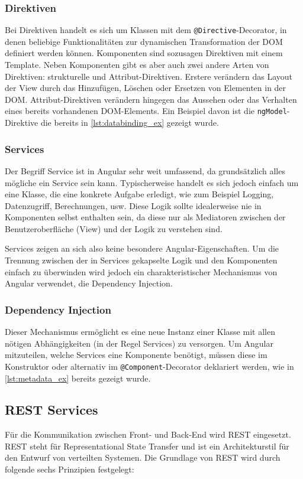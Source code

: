 \subsubsection{Direktiven}
Bei Direktiven handelt es sich um Klassen mit dem \texttt{@Directive}-Decorator, in denen beliebige Funktionalitäten zur dynamischen Transformation der DOM definiert werden können. Komponenten sind sozusagen Direktiven mit einem Template. Neben Komponenten gibt es aber auch zwei andere Arten von Direktiven: strukturelle und Attribut-Direktiven. Erstere verändern das Layout der View durch das Hinzufügen, Löschen oder Ersetzen von Elementen in der \acs{DOM}. Attribut-Direktiven verändern hingegen das Aussehen oder das Verhalten eines bereits vorhandenen DOM-Elements. Ein Beispiel davon ist die \texttt{ngModel}-Direktive die bereits in \cref{lst:databinding_ex} gezeigt wurde.

\subsubsection{Services}
Der Begriff Service ist in Angular sehr weit umfassend, da grundsätzlich alles mögliche ein Service sein kann. Typischerweise handelt es sich jedoch einfach um eine Klasse, die eine konkrete Aufgabe erledigt, wie zum Beispiel Logging, Datenzugriff, Berechnungen, usw. Diese Logik sollte idealerweise nie in Komponenten selbst enthalten sein, da diese nur als Mediatoren zwischen der Benutzeroberfläche (View) und der Logik zu verstehen sind.

Services zeigen an sich also keine besondere Angular-Eigenschaften. Um die Trennung zwischen der in Services gekapselte Logik und den Komponenten einfach zu überwinden wird jedoch ein charakteristischer Mechanismus von Angular verwendet, die Dependency Injection. 

\subsubsection{Dependency Injection}
Dieser Mechanismus ermöglicht es eine neue Instanz einer Klasse mit allen nötigen Abhängigkeiten (in der Regel Services) zu versorgen. Um Angular mitzuteilen, welche Services eine Komponente benötigt, müssen diese im Konstruktor oder alternativ im \texttt{@Component}-Decorator deklariert werden, wie in \cref{lst:metadata_ex} bereits gezeigt wurde.

\subsection{REST Services}
Für die Kommunikation zwischen Front- und Back-End wird REST eingesetzt. REST steht für Representational State Transfer und ist ein Architekturstil für den Entwurf von verteilten Systemen. Die Grundlage von REST wird durch folgende sechs Prinzipien festgelegt\cite{Varanasi2015}:

